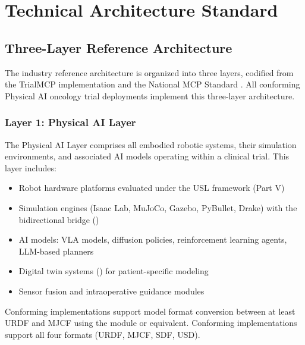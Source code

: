 \documentclass[11pt,letterpaper]{article}
\begin{document}
\section{Technical Architecture Standard}
\label{sec:part2}

\subsection{Three-Layer Reference Architecture}

The industry reference architecture is organized into three layers, codified from the TrialMCP implementation \cite{kawchak2026mcp} and the National MCP Standard \cite{kawchak2026nationalmcp}. All conforming Physical AI oncology trial deployments \SHALL{} implement this three-layer architecture.

\subsubsection{Layer 1: Physical AI Layer}

The Physical AI Layer comprises all embodied robotic systems, their simulation environments, and associated AI models operating within a clinical trial. This layer includes:

\begin{itemize}
  \item Robot hardware platforms evaluated under the USL framework (Part V)
  \item Simulation engines (Isaac Lab, MuJoCo, Gazebo, PyBullet, Drake) with the bidirectional bridge ()
  \item AI models: VLA models, diffusion policies, reinforcement learning agents, LLM-based planners
  \item Digital twin systems () for patient-specific modeling
  \item Sensor fusion and intraoperative guidance modules
\end{itemize}

Conforming implementations \SHALL{} support model format conversion between at least URDF and MJCF using the  module or equivalent. Conforming implementations \SHOULD{} support all four formats (URDF, MJCF, SDF, USD).
\end{document}

